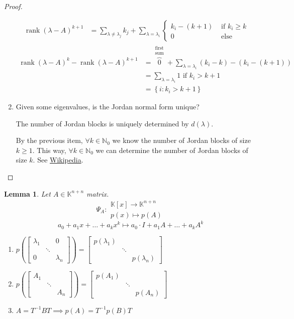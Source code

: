 \documentclass{article}
\newcounter{lecref}[section]
\numberwithin{lecref}{section}
\newtheorem{lemma}[lecref]{Lemma}
\newcommand{\set}[1]{\left\{#1\right\}}
\DeclareMathOperator{\rank}{rank}
\begin{document}
\begin{proof}
\begin{enumerate}
\begin{align*}
        \rank(\lambda - A)^{k+1} &= \sum_{\lambda \neq \lambda_j} k_j + \sum_{\lambda = \lambda_i} \begin{cases} k_i - (k+1) & \text{ if } k_i \geq k \\ 0 & \text{ else} \end{cases}
      \end{align*}
      \begin{align*}
        \rank(\lambda - A)^k - \rank(\lambda - A)^{k+1}
          &= \overbrace{0}^{\substack{\text{first} \\ \text{sum}}} + \sum_{\lambda = \lambda_i} (k_i - k) - (k_i - (k+1)) \\
          &= \sum_{\lambda = \lambda_i} 1 \text{ if } k_i > k+1 \\
          &= \set{i: k_i > k + 1}
      \end{align*}
    \item Given some eigenvalues, is the Jordan normal form unique?

        The number of Jordan blocks is uniquely determined by $d(\lambda)$.

        By the previous item, $\forall k \in \mathbb N_0$ we know the number of Jordan blocks of size $k \geq 1$.
        This way, $\forall k \in \mathbb N_0$ we can determine the number of Jordan blocks of size $k$.
        See \href{https://en.wikipedia.org/w/index.php?title=Jordan_normal_form&oldid=819574479#Uniqueness}{Wikipedia}.
  \end{enumerate}
\end{proof}

\begin{lemma} %
  Let $A \in \mathbb K^{n + n}$ matrix.
  \[ \Psi_A: \substack{\mathbb K[x] \to \mathbb K^{n + n} \\ p(x) \mapsto p(A)} \]
  \[ a_0 + a_1 x + \dots + a_k x^k \mapsto a_0 \cdot I + a_1 A + \dots + a_k A^k \]
  \begin{enumerate}
    \item $p\left(\begin{bmatrix} \lambda_1 & & 0 \\ & \ddots & \\ 0 & & \lambda_n \end{bmatrix}\right)
      = \begin{bmatrix} p(\lambda_1) & & \\ & \ddots & \\ & & p(\lambda_n) \end{bmatrix}$
    \item $p\left(\begin{bmatrix} A_1 & & \\ & \ddots & \\ & & A_n \end{bmatrix}\right) = \begin{bmatrix} p(A_1) & & \\ & \ddots & \\ & & p(A_n) \end{bmatrix}$
    \item $A = T^{-1} BT \implies p(A) = T^{-1} p(B) T$
  \end{enumerate}
\end{lemma}
\end{document}
